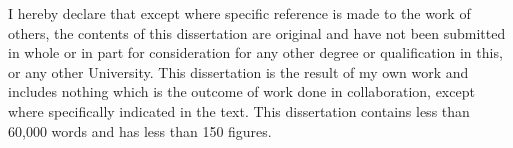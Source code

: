 
\begin{declaration}

I hereby declare that except where specific reference is made to the work of others, the contents of this dissertation are original and have not been submitted in whole or in part for consideration for any other degree or qualification in this, or any other University. This dissertation is the result of my own work and includes nothing which is the outcome of work done in collaboration, except where specifically indicated in the text. This dissertation contains less than 60,000 words 
and has less than 150 figures.


\end{declaration}

